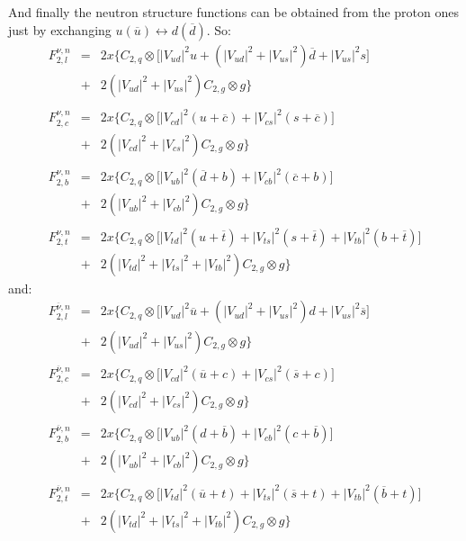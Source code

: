 \documentclass[10pt,a4paper]{article}
\begin{document}
And finally the neutron structure functions can be obtained from the
proton ones just by exchanging $u(\overline{u})\leftrightarrow
d(\overline{d})$. So:
\begin{equation}
\begin{array}{rcl}  
F_{2,l}^{\nu,n} &=& 2x\Big\{C_{2,q}\otimes\Big[|V_{ud}|^2 u +\left(|V_{ud}|^2+|V_{us}|^2\right)\overline{d} + |V_{us}|^2 s\Big]\\
                &+& 2\left(|V_{ud}|^2+|V_{us}|^2\right)C_{2,g}\otimes g\Big\}\\
\\
F_{2,c}^{\nu,n} &=& 2x\Big\{C_{2,q}\otimes\Big[|V_{cd}|^2(u+\overline{c}) + |V_{cs}|^2 (s+\overline{c})\Big]\\
                &+& 2\left(|V_{cd}|^2+|V_{cs}|^2\right)C_{2,g}\otimes g\Big\}\\
\\
F_{2,b}^{\nu,n} &=& 2x\Big\{C_{2,q}\otimes\Big[|V_{ub}|^2 (\overline{d}+b) + |V_{cb}|^2 (\overline{c}+b)\Big]\\
                &+& 2\left(|V_{ub}|^2+|V_{cb}|^2\right)C_{2,g}\otimes g\Big\}\\
\\
F_{2,t}^{\nu,n} &=& 2x\Big\{C_{2,q}\otimes\Big[|V_{td}|^2 (u +\overline{t})+ |V_{ts}|^2(s+\overline{t}) + |V_{tb}|^2(b+\overline{t})\Big]\\
                &+& 2\left(|V_{td}|^2 + |V_{ts}|^2 + |V_{tb}|^2\right)C_{2,g}\otimes g\Big\}
\end{array}
\end{equation}
and:
\begin{equation}
\begin{array}{rcl}  
F_{2,l}^{\overline\nu,n} &=& 2x\Big\{C_{2,q}\otimes\Big[|V_{ud}|^2\overline{u}+\left(|V_{ud}|^2+|V_{us}|^2\right)d + |V_{us}|^2 \overline{s}\Big]\\
                &+& 2\left(|V_{ud}|^2+|V_{us}|^2\right)C_{2,g}\otimes g\Big\}\\
\\
F_{2,c}^{\overline\nu,n} &=& 2x\Big\{C_{2,q}\otimes\Big[|V_{cd}|^2(\overline{u}+c) + |V_{cs}|^2 (\overline{s}+c)\Big]\\
                &+& 2\left(|V_{cd}|^2+|V_{cs}|^2\right)C_{2,g}\otimes g\Big\}\\
\\
F_{2,b}^{\overline\nu,n} &=& 2x\Big\{C_{2,q}\otimes\Big[|V_{ub}|^2 (d+\overline{b}) + |V_{cb}|^2 (c+\overline{b})\Big]\\
                &+& 2\left(|V_{ub}|^2+|V_{cb}|^2\right)C_{2,g}\otimes g\Big\}\\
\\
F_{2,t}^{\overline\nu,n} &=& 2x\Big\{C_{2,q}\otimes\Big[|V_{td}|^2 (\overline{u} +t)+ |V_{ts}|^2(\overline{s}+t) + |V_{tb}|^2(\overline{b}+t)\Big]\\
                &+& 2\left(|V_{td}|^2 + |V_{ts}|^2 + |V_{tb}|^2\right)C_{2,g}\otimes g\Big\}
\end{array}
\end{equation}
\end{document}
